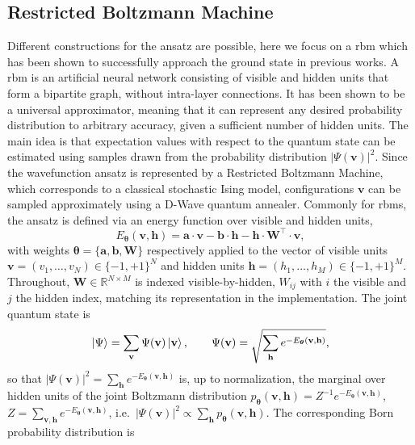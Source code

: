 \documentclass[10pt,a4paper]{article}
\numberwithin{equation}{section}
\begin{document}
\subsection{Restricted Boltzmann Machine}
Different constructions for the ansatz are possible, here we focus on a \gls{rbm} which has been shown to successfully approach the ground state in previous  works\cite{PhysRevResearch.2.023266,Carleo_2017,Gardas_2018}. A \gls{rbm} is an artificial neural network consisting of visible and hidden units that form a bipartite graph, without intra-layer connections. It has been shown to be a universal approximator, meaning that it can represent any desired probability distribution to arbitrary accuracy\cite{10.1162/neco.2008.04-07-510}, given a sufficient number of hidden units. The main idea is that expectation values with respect to the quantum state can be estimated using samples drawn from the probability distribution $|\Psi(\mathbf{v})|^2$. Since the wavefunction ansatz is represented by a Restricted Boltzmann Machine, which corresponds to a classical stochastic Ising model, configurations $\mathbf{v}$ can be sampled approximately using a D-Wave quantum annealer.
Commonly for \glspl{rbm}, the ansatz is defined via an energy function over visible and hidden units,
\begin{equation}
E_{\boldsymbol\theta}(\mathbf{v},\mathbf{h})=\mathbf{a}\cdot \mathbf{v} -\mathbf{b}\cdot \mathbf{h} - \mathbf{h}\cdot \mathbf{W}^\top \cdot \mathbf{v},
\end{equation}
with weights $\boldsymbol\theta=\{\mathbf{a}, \mathbf{b}, \mathbf{W}\}$ respectively applied to the vector of visible units $\mathbf{v}=(v_1, \ldots, v_N)\in\{-1,+1\}^N$ and hidden units $\mathbf{h}=(h_1, \ldots, h_M)\in\{-1,+1\}^M$. Throughout, $\mathbf{W}\in\mathbb{R}^{N\times M}$ is indexed visible-by-hidden, $W_{ij}$ with $i$ the visible and $j$ the hidden index, matching its representation in the implementation. The joint quantum state is
\begin{equation}
\label{eq:rawansatz}
\ket\Psi =\sum_{\mathbf{v}}\Psi(\mathbf{v})\ket{\mathbf{v}}, \qquad \Psi(\mathbf{v})=\sqrt{\sum_{\mathbf{h}} e^{-E_{\boldsymbol\theta}(\mathbf{v},\mathbf{h})}},
\end{equation}
so that $|\Psi(\mathbf{v})|^2=\sum_{\mathbf{h}} e^{-E_{\boldsymbol\theta}(\mathbf{v},\mathbf{h})}$ is, up to normalization, the marginal over hidden units of the joint Boltzmann distribution $p_{\boldsymbol\theta}(\mathbf{v},\mathbf{h})=Z^{-1}e^{-E_{\boldsymbol\theta}(\mathbf{v},\mathbf{h})}$, $Z=\sum_{\mathbf{v},\mathbf{h}}e^{-E_{\boldsymbol\theta}(\mathbf{v},\mathbf{h})}$, i.e.\ $|\Psi(\mathbf{v})|^2 \propto \sum_{\mathbf{h}} p_{\boldsymbol\theta}(\mathbf{v},\mathbf{h})$. The corresponding Born probability distribution is
\end{document}
